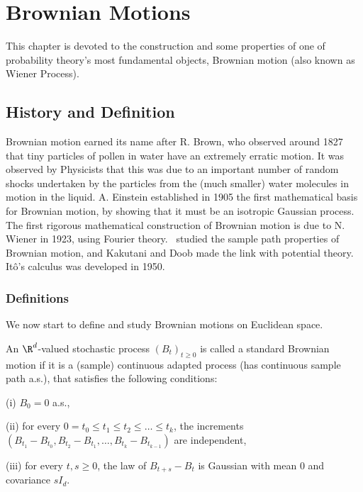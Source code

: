 \chapter{Brownian Motions}

This chapter is devoted to the construction and some properties of one of probability theory's most fundamental objects, Brownian motion (also known as Wiener Process).


\section{History and Definition}


Brownian motion earned its name after R. Brown, who observed around 1827 that tiny particles of pollen in water have an extremely erratic motion. It was observed by Physicists that this was due to an important number of random shocks undertaken by the particles from the (much smaller) water molecules in motion in the liquid. A. Einstein established in 1905 the first mathematical basis for Brownian motion, by showing that it must be an isotropic Gaussian process. The first rigorous mathematical construction of Brownian motion is due to N. Wiener in 1923, using Fourier theory. \levy\ studied the sample path properties of Brownian motion, and Kakutani and Doob made the link with potential theory. It\^o's calculus was developed in 1950.



\subsection{Definitions}

We now start to define and study Brownian motions on Euclidean space.

\begin{definition}\label{def:standard_brownian_motion_d}
An $\R^d$-valued stochastic process $(B_t)_{t \geq 0}$ is called a standard Brownian motion if it is a (sample) continuous adapted process (has continuous sample path a.s.), that satisfies the following conditions:
\ben
\item [(i)] $B_0 = 0$ a.s.,
\item [(ii)] for every $0 = t_0 \leq t_1 \leq t_2 \leq \dots \leq t_k$, the increments $(B_{t_1} - B_{t_0} ,B_{t_2} - B_{t_1} ,\dots, B_{t_k} - B_{t_{k-1}})$ are independent,
\item [(iii)] for every $t, s \geq 0$, the law of $B_{t+s} - B_t$ is Gaussian with mean 0 and covariance $sI_d$.
\een
\end{definition}

